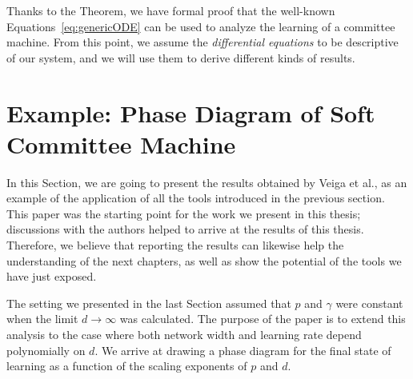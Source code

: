 Thanks to the Theorem, we have formal proof that the well-known Equations~\eqref{eq:genericODE}
can be used to analyze the learning of a committee machine. From this point,
we assume the \emph{differential equations} to be descriptive of our system,
and we will use them to derive different kinds of results.




\section{Example: Phase Diagram of Soft Committee Machine}
In this Section, we are going to present the results obtained by Veiga et al.\cite{veiga2022phase},
as an example of the application of all the tools introduced in the previous section.
This paper was the starting point for the work we present in this thesis;
discussions with the authors helped to arrive at the results of this thesis.
Therefore, we believe that reporting the results can likewise help the understanding of the next chapters,
as well as show the potential of the tools we have just exposed.

The setting we presented in the last Section assumed that \(p\) and \(\gamma\) were constant when the limit \(d\to\infty\) was calculated.
The purpose of the paper is to extend this analysis to the case where both network width and learning rate depend polynomially on \(d\).
We arrive at drawing a phase diagram for the final state of learning as a function of the scaling exponents of \(p\) and \(d\).

